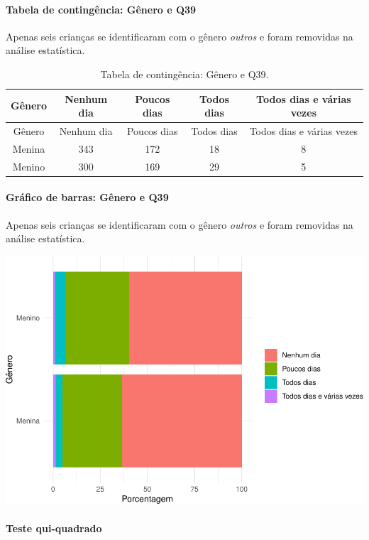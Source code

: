 \documentclass[]{article}
\let\oldparagraph\paragraph
\renewcommand{\paragraph}[1]{\oldparagraph{#1}\mbox{}}
\begin{document}
\cleardoublepage

\hypertarget{tabela-de-continguxeancia-guxeanero-e-q39}{%
\paragraph{Tabela de contingência: Gênero e Q39}\label{tabela-de-continguxeancia-guxeanero-e-q39}}

Apenas seis crianças se identificaram com o gênero \emph{outros} e foram removidas na análise estatística.

\begin{longtable}[]{@{}ccccc@{}}
\caption{\label{tab:unnamed-chunk-1497}Tabela de contingência: Gênero e Q39.}\tabularnewline
\toprule
Gênero & Nenhum dia & Poucos dias & Todos dias & Todos dias e várias vezes\tabularnewline
\midrule
\endfirsthead
\toprule
Gênero & Nenhum dia & Poucos dias & Todos dias & Todos dias e várias vezes\tabularnewline
\midrule
\endhead
Menina & 343 & 172 & 18 & 8\tabularnewline
Menino & 300 & 169 & 29 & 5\tabularnewline
\bottomrule
\end{longtable}

\hypertarget{gruxe1fico-de-barras-guxeanero-e-q39}{%
\paragraph{Gráfico de barras: Gênero e Q39}\label{gruxe1fico-de-barras-guxeanero-e-q39}}

Apenas seis crianças se identificaram com o gênero \emph{outros} e foram removidas na análise estatística.

\begin{center}\includegraphics[width=0.75\linewidth]{relatorio_covid19_files/figure-latex/unnamed-chunk-1498-1} \end{center}

\hypertarget{teste-qui-quadrado-128}{%
\paragraph{Teste qui-quadrado}\label{teste-qui-quadrado-128}}
\end{document}
